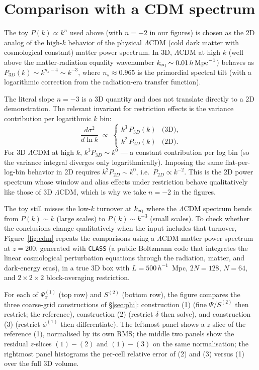 \documentclass[12pt]{article}
\newcommand{\toyn}{-2}
\begin{document}
\section{Comparison with a CDM spectrum}\label{sec:cdm}

The toy $P(k)\propto k^n$ used above (with $n=\toyn$ in our figures) is
chosen as the 2D analog of the high-$k$ behavior of the physical
$\Lambda$CDM (cold dark matter with cosmological constant) matter
power spectrum. In 3D, $\Lambda$CDM at high $k$ (well above the
matter-radiation equality wavenumber
$k_{\rm eq}\sim 0.01\,h\,\text{Mpc}^{-1}$) behaves as
$P_{3D}(k)\sim k^{n_s-4}\sim k^{-3}$, where $n_s\approx 0.965$ is the
primordial spectral tilt (with a logarithmic correction from the
radiation-era transfer function).

The literal slope $n=-3$ is a 3D quantity and does not translate
directly to a 2D demonstration. The relevant invariant for restriction
effects is the variance contribution per logarithmic $k$ bin:
\begin{equation}
  \frac{d\sigma^2}{d\ln k} \;\propto\;
  \begin{cases}
    k^{3}\,P_{3D}(k) & \text{(3D)},\\[2pt]
    k^{2}\,P_{2D}(k) & \text{(2D)}.
  \end{cases}
\end{equation}
For 3D $\Lambda$CDM at high $k$, $k^3 P_{3D}\sim k^0$ --- a constant
contribution per log bin (so the variance integral diverges only
logarithmically). Imposing the same flat-per-log-bin behavior in 2D
requires $k^2 P_{2D}\sim k^0$, i.e.\ $P_{2D}\propto k^{-2}$. This is
the 2D power spectrum whose window and alias effects under restriction
behave qualitatively like those of 3D $\Lambda$CDM, which is why we
take $n=\toyn$ in the figures.

The toy still misses the low-$k$ turnover at $k_{\rm eq}$ where the
$\Lambda$CDM spectrum bends from $P(k)\sim k$ (large scales) to
$P(k)\sim k^{-3}$ (small scales). To check whether the conclusions
change qualitatively when the input includes that turnover,
Figure~\ref{fig:cdm} repeats the comparisons using a $\Lambda$CDM
matter power spectrum at $z=200$, generated with \texttt{CLASS} (a
public Boltzmann code that integrates the linear cosmological
perturbation equations through the radiation, matter, and dark-energy
eras), in a true 3D box with $L=500\,h^{-1}$~Mpc, $2N=128$, $N=64$,
and $2\times 2\times 2$ block-averaging restriction.

For each of $\Psi_x^{(1)}$ (top row) and $S^{(2)}$ (bottom row), the
figure compares the three coarse-grid constructions of \S\ref{sec:phi}:
construction (1) (fine $\Psi$/$S^{(2)}$ then restrict; the reference),
construction (2) (restrict $\delta$ then solve), and construction (3)
(restrict $\phi^{(1)}$ then differentiate). The leftmost panel shows a
$z$-slice of the reference (1), normalised by its own RMS; the middle
two panels show the residual $z$-slices $(1)-(2)$ and $(1)-(3)$ on the
same normalisation; the rightmost panel histograms the per-cell
relative error of (2) and (3) versus (1) over the full 3D volume.
\end{document}
